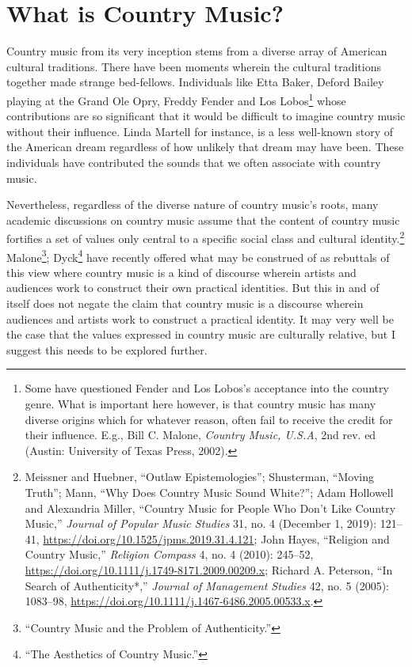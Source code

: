 \documentclass[phdthesis,12pt,final]{wuthesis}
\theoremstyle{definition}
\theoremstyle{definition}
\theoremstyle{definition}
\theoremstyle{definition}
\theoremstyle{remark}
\begin{document}
\section{What is Country Music?}\label{what-is-country-music}

Country music from its very inception stems from a diverse array of American cultural traditions. There have been moments wherein the cultural traditions together made strange bed-fellows. Individuals like Etta Baker, Deford Bailey playing at the Grand Ole Opry, Freddy Fender and Los Lobos\footnote{Some have questioned Fender and Los Lobos's acceptance into the country genre. What is important here however, is that country music has many diverse origins which for whatever reason, often fail to receive the credit for their influence. E.g., Bill C. Malone, \emph{Country Music, {U}.{S}.{A}}, 2nd rev. ed (Austin: University of Texas Press, 2002).} whose contributions are so significant that it would be difficult to imagine country music without their influence. Linda Martell for instance, is a less well-known story of the American dream regardless of how unlikely that dream may have been. These individuals have contributed the sounds that we often associate with country music.

Nevertheless, regardless of the diverse nature of country music's roots, many academic discussions on country music assume that the content of country music fortifies a set of values only central to a specific social class and cultural identity.\footnote{Meissner and Huebner, {``Outlaw Epistemologies''}; Shusterman, {``Moving {Truth}''}; Mann, {``Why Does Country Music Sound White?''}; Adam Hollowell and Alexandria Miller, {``Country {Music} for {People Who Don}'t {Like Country Music},''} \emph{Journal of Popular Music Studies} 31, no. 4 (December 1, 2019): 121--41, \url{https://doi.org/10.1525/jpms.2019.31.4.121}; John Hayes, {``Religion and {Country Music},''} \emph{Religion Compass} 4, no. 4 (2010): 245--52, \url{https://doi.org/10.1111/j.1749-8171.2009.00209.x}; Richard A. Peterson, {``In {Search} of {Authenticity}*,''} \emph{Journal of Management Studies} 42, no. 5 (2005): 1083--98, \url{https://doi.org/10.1111/j.1467-6486.2005.00533.x}.} Malone\footnote{{``Country {Music} and the {Problem} of {Authenticity}.''}}; Dyck\footnote{{``The Aesthetics of Country Music.''}} have recently offered what may be construed of as rebuttals of this view where country music is a kind of discourse wherein artists and audiences work to construct their own practical identities. But this in and of itself does not negate the claim that country music is a discourse wherein audiences and artists work to construct a practical identity. It may very well be the case that the values expressed in country music are culturally relative, but I suggest this needs to be explored further.
\end{document}
